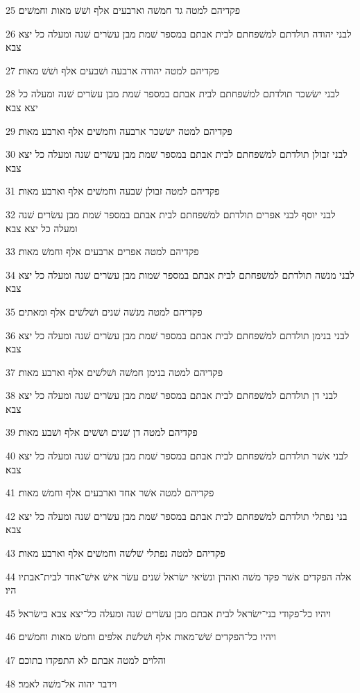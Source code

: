 \par 25 פקדיהם למטה גד חמשׁה וארבעים אלף ושׁשׁ מאות וחמשׁים׃
\par 26 לבני יהודה תולדתם למשׁפחתם לבית אבתם במספר שׁמת מבן עשׂרים שׁנה ומעלה כל יצא צבא׃
\par 27 פקדיהם למטה יהודה ארבעה ושׁבעים אלף ושׁשׁ מאות׃
\par 28 לבני ישׂשכר תולדתם למשׁפחתם לבית אבתם במספר שׁמת מבן עשׂרים שׁנה ומעלה כל יצא צבא׃
\par 29 פקדיהם למטה ישׂשכר ארבעה וחמשׁים אלף וארבע מאות׃
\par 30 לבני זבולן תולדתם למשׁפחתם לבית אבתם במספר שׁמת מבן עשׂרים שׁנה ומעלה כל יצא צבא׃
\par 31 פקדיהם למטה זבולן שׁבעה וחמשׁים אלף וארבע מאות׃
\par 32 לבני יוסף לבני אפרים תולדתם למשׁפחתם לבית אבתם במספר שׁמת מבן עשׂרים שׁנה ומעלה כל יצא צבא׃
\par 33 פקדיהם למטה אפרים ארבעים אלף וחמשׁ מאות׃
\par 34 לבני מנשׁה תולדתם למשׁפחתם לבית אבתם במספר שׁמות מבן עשׂרים שׁנה ומעלה כל יצא צבא׃
\par 35 פקדיהם למטה מנשׁה שׁנים ושׁלשׁים אלף ומאתים׃
\par 36 לבני בנימן תולדתם למשׁפחתם לבית אבתם במספר שׁמת מבן עשׂרים שׁנה ומעלה כל יצא צבא׃
\par 37 פקדיהם למטה בנימן חמשׁה ושׁלשׁים אלף וארבע מאות׃
\par 38 לבני דן תולדתם למשׁפחתם לבית אבתם במספר שׁמת מבן עשׂרים שׁנה ומעלה כל יצא צבא׃
\par 39 פקדיהם למטה דן שׁנים ושׁשׁים אלף ושׁבע מאות׃
\par 40 לבני אשׁר תולדתם למשׁפחתם לבית אבתם במספר שׁמת מבן עשׂרים שׁנה ומעלה כל יצא צבא׃
\par 41 פקדיהם למטה אשׁר אחד וארבעים אלף וחמשׁ מאות׃
\par 42 בני נפתלי תולדתם למשׁפחתם לבית אבתם במספר שׁמת מבן עשׂרים שׁנה ומעלה כל יצא צבא׃
\par 43 פקדיהם למטה נפתלי שׁלשׁה וחמשׁים אלף וארבע מאות׃
\par 44 אלה הפקדים אשׁר פקד משׁה ואהרן ונשׂיאי ישׂראל שׁנים עשׂר אישׁ אישׁ־אחד לבית־אבתיו היו׃
\par 45 ויהיו כל־פקודי בני־ישׂראל לבית אבתם מבן עשׂרים שׁנה ומעלה כל־יצא צבא בישׂראל׃
\par 46 ויהיו כל־הפקדים שׁשׁ־מאות אלף ושׁלשׁת אלפים וחמשׁ מאות וחמשׁים׃
\par 47 והלוים למטה אבתם לא התפקדו בתוכם׃
\par 48 וידבר יהוה אל־משׁה לאמר׃
